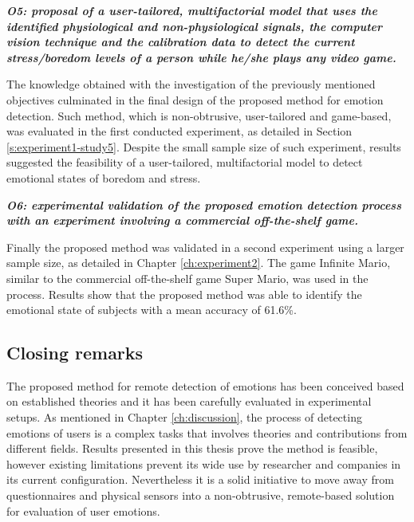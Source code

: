 \textit{\textbf{O5: proposal of a user-tailored, multifactorial model that uses the identified physiological and non-physiological signals, the computer vision technique and the calibration data to detect the current stress/boredom levels of a person while he/she plays any video game.}}

The knowledge obtained with the investigation of the previously mentioned objectives culminated in the final design of the proposed method for emotion detection. Such method, which is non-obtrusive, user-tailored and game-based, was evaluated in the first conducted experiment, as detailed in Section \ref{s:experiment1-study5}. Despite the small sample size of such experiment, results suggested the feasibility of a user-tailored, multifactorial model to detect emotional states of boredom and stress.

\textit{\textbf{O6: experimental validation of the proposed emotion detection process with an experiment involving a commercial off-the-shelf game.}}

Finally the proposed method was validated in a second experiment using a larger sample size, as detailed in Chapter \ref{ch:experiment2}. The game Infinite Mario, similar to the commercial off-the-shelf game Super Mario, was used in the process. Results show that the proposed method was able to identify the emotional state of subjects with a mean accuracy of 61.6\%.

\subsection{Closing remarks}

The proposed method for remote detection of emotions has been conceived based on established theories and it has been carefully evaluated in experimental setups. As mentioned in Chapter \ref{ch:discussion}, the process of detecting emotions of users is a complex tasks that involves theories and contributions from different fields. Results presented in this thesis prove the method is feasible, however existing limitations prevent its wide use by researcher and companies in its current configuration. Nevertheless it is a solid initiative to move away from questionnaires and physical sensors into a non-obtrusive, remote-based solution for evaluation of user emotions.


